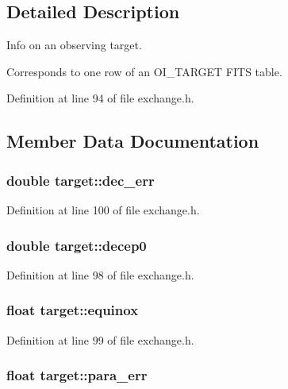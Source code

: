 \subsection{Detailed Description}
Info on an observing target.

Corresponds to one row of an OI\_\-TARGET FITS table. 

Definition at line 94 of file exchange.h.



\subsection{Member Data Documentation}
\hypertarget{structtarget_a76aee9a0981bbcace91e379b4df6d100}{
\subsubsection[{dec\_\-err}]{\setlength{\rightskip}{0pt plus 5cm}double {\bf target::dec\_\-err}}}
\label{structtarget_a76aee9a0981bbcace91e379b4df6d100}


Definition at line 100 of file exchange.h.

\hypertarget{structtarget_a5423dd9bfc2da6209af70f09aab53651}{
\subsubsection[{decep0}]{\setlength{\rightskip}{0pt plus 5cm}double {\bf target::decep0}}}
\label{structtarget_a5423dd9bfc2da6209af70f09aab53651}


Definition at line 98 of file exchange.h.

\hypertarget{structtarget_a130c24101c792f56b35b0a86d9d8d1a6}{
\subsubsection[{equinox}]{\setlength{\rightskip}{0pt plus 5cm}float {\bf target::equinox}}}
\label{structtarget_a130c24101c792f56b35b0a86d9d8d1a6}


Definition at line 99 of file exchange.h.

\hypertarget{structtarget_a23a3834cdc18d79fe8f4ec521117c1ba}{
\subsubsection[{para\_\-err}]{\setlength{\rightskip}{0pt plus 5cm}float {\bf target::para\_\-err}}}
\label{structtarget_a23a3834cdc18d79fe8f4ec521117c1ba}


